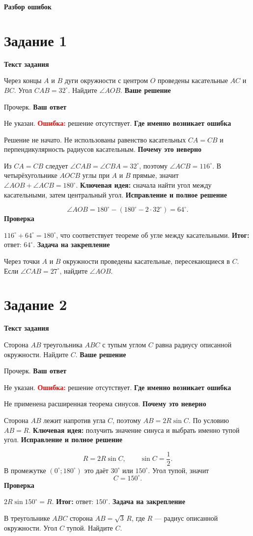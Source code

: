 \documentclass[12pt,a4paper]{article}
\newcommand{\errorlabel}[1]{\textcolor{red}{\textbf{Ошибка:}} #1}
\newcommand{\keyidea}[1]{\textcolor{blue!60!black}{\textbf{Ключевая идея:}} #1}
\newcommand{\finalnote}[1]{\textcolor{teal!60!black}{\textbf{Итог:}} #1}
\newcommand{\taskhead}[1]{\newpage\phantomsection\label{task:#1}\section*{Задание #1}}
\newcommand{\subhead}[1]{\vspace{0.2em}\textbf{#1}\par}
\begin{document}
\setlength{\tabcolsep}{6pt}
\normalsize

\newpage
\thispagestyle{empty}
\vspace*{\fill}
\begin{center}{\LARGE\bfseries Разбор ошибок}\end{center}
\vspace*{\fill}

\taskhead{1}
\subhead{Текст задания}
Через концы $A$ и $B$ дуги окружности с центром $O$ проведены касательные $AC$ и $BC$. Угол $CAB=32^\circ$. Найдите $\angle AOB$.
\subhead{Ваше решение} Прочерк. \subhead{Ваш ответ} Не указан.
\errorlabel{решение отсутствует.}
\subhead{Где именно возникает ошибка}
Решение не начато. Не использованы равенство касательных $CA=CB$ и перпендикулярность радиусов касательным.
\subhead{Почему это неверно}
Из $CA=CB$ следует $\angle CAB=\angle CBA=32^\circ$, поэтому $\angle ACB=116^\circ$. В четырёхугольнике $AOCB$ углы при $A$ и $B$ прямые, значит $\angle AOB+\angle ACB=180^\circ$.
\keyidea{сначала найти угол между касательными, затем центральный угол.}
\subhead{Исправление и полное решение}
\[
\angle AOB=180^\circ-(180^\circ-2\cdot32^\circ)=64^\circ.
\]
\subhead{Проверка}
$116^\circ+64^\circ=180^\circ$, что соответствует теореме об угле между касательными.
\finalnote{ответ: $64^\circ$.}
\subhead{Задача на закрепление}
Через точки $A$ и $B$ окружности проведены касательные, пересекающиеся в $C$. Если $\angle CAB=27^\circ$, найдите $\angle AOB$.

\taskhead{2}
\subhead{Текст задания}
Сторона $AB$ треугольника $ABC$ с тупым углом $C$ равна радиусу описанной окружности. Найдите $C$.
\subhead{Ваше решение} Прочерк. \subhead{Ваш ответ} Не указан.
\errorlabel{решение отсутствует.}
\subhead{Где именно возникает ошибка}
Не применена расширенная теорема синусов.
\subhead{Почему это неверно}
Сторона $AB$ лежит напротив угла $C$, поэтому $AB=2R\sin C$. По условию $AB=R$.
\keyidea{получить значение синуса и выбрать именно тупой угол.}
\subhead{Исправление и полное решение}
\[
R=2R\sin C,\qquad \sin C=\frac12.
\]
В промежутке $(0^\circ;180^\circ)$ это даёт $30^\circ$ или $150^\circ$. Угол тупой, значит
\[
C=150^\circ.
\]
\subhead{Проверка}
$2R\sin150^\circ=R$.
\finalnote{ответ: $150^\circ$.}
\subhead{Задача на закрепление}
В треугольнике $ABC$ сторона $AB=\sqrt3\,R$, где $R$ --- радиус описанной окружности. Угол $C$ тупой. Найдите $C$.
\end{document}
